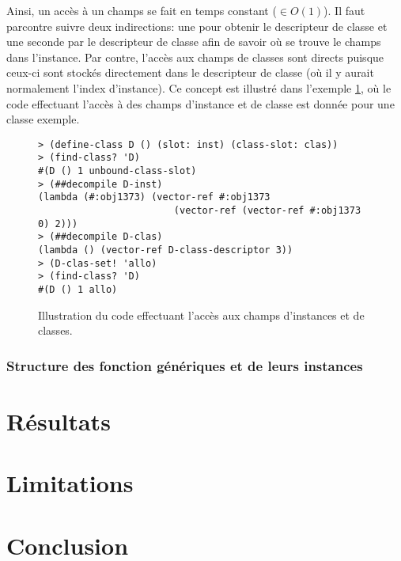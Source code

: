 \documentclass[letterpaper,12pt]{book}
\begin{document}
      Ainsi, un accès à un champs se fait en temps constant ($\in
      O(1)$). Il faut parcontre suivre deux indirections: une pour
      obtenir le descripteur de classe et une seconde par le
      descripteur de classe afin de savoir où se trouve le champs dans
      l'instance. Par contre, l'accès aux champs de classes sont
      directs puisque ceux-ci sont stockés directement dans le
      descripteur de classe (où il y aurait normalement l'index
      d'instance). Ce concept est illustré dans l'exemple
      \ref{ex-slot-access}, où le code effectuant l'accès à des champs
      d'instance et de classe est donnée pour une classe exemple.

      \begin{figure}[h!]
        \begin{lstlisting}
> (define-class D () (slot: inst) (class-slot: clas))
> (find-class? 'D)
#(D () 1 unbound-class-slot)
> (##decompile D-inst)
(lambda (#:obj1373) (vector-ref #:obj1373 
                        (vector-ref (vector-ref #:obj1373 0) 2)))
> (##decompile D-clas)
(lambda () (vector-ref D-class-descriptor 3))
> (D-clas-set! 'allo)
> (find-class? 'D)
#(D () 1 allo)
        \end{lstlisting}
        \caption{Illustration du code effectuant l'accès aux champs
          d'instances et de classes.}
        \label{ex-slot-access}
      \end{figure}

    \subsubsection{Structure des fonction génériques et de leurs instances}
    
    

\clearpage

\section{Résultats}

\clearpage

 
\section{Limitations}


\clearpage

\section{Conclusion}


\clearpage




\end{document}
